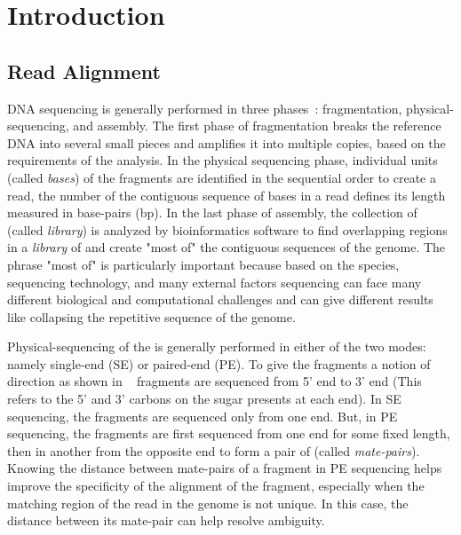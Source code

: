 
\chapter{Introduction} %
\label{intro} %


\section{Read Alignment}
DNA sequencing is generally performed in three phases~\citep{schadt2010window}: fragmentation, physical-sequencing, and assembly. The first phase of fragmentation breaks the reference DNA into several small pieces and amplifies it into multiple copies, based on the requirements of the analysis. In the physical sequencing phase, individual units (called \textit{bases}) of the fragments are identified in the sequential order to create a read, the number of the contiguous sequence of bases in a read defines its length measured in base-pairs (bp). In the last phase of assembly, the collection of \reads (called \textit{library}) is analyzed by bioinformatics software to find overlapping regions in a \textit{library} of \reads and create "most of" the contiguous sequences of the genome. The phrase "most of" is particularly important because based on the species, sequencing technology, and many external factors sequencing can face many different biological and computational challenges and can give different results like collapsing the repetitive sequence of the genome.


\begin{figure*}[!htb]
\centering
\texttt{[image: rapmap/\{Avi.RPE.fig.4]}.pdf}
\caption{From top to bottom: Single-End Sequencing, Paired-End Sequencing, information retained after Paired-End sequencing.}
\label{fig:pe-seq}
\end{figure*}


Physical-sequencing of the \reads is generally performed in either of the two modes: namely single-end (SE) or paired-end (PE). To give the fragments a notion of direction as shown in ~ fragments are sequenced from 5' end to 3' end (This refers to the 5' and 3' carbons on the sugar presents at each end). In SE sequencing, the fragments are sequenced only from one end. But, in PE sequencing, the fragments are first sequenced from one end for some fixed length, then in another from the opposite end to form a pair of \reads (called \textit{mate-pairs}). Knowing the distance between mate-pairs of a fragment in PE sequencing helps improve the specificity of the alignment of the fragment, especially when the matching region of the read in the genome is not unique. In this case, the distance between its mate-pair can help resolve ambiguity.

